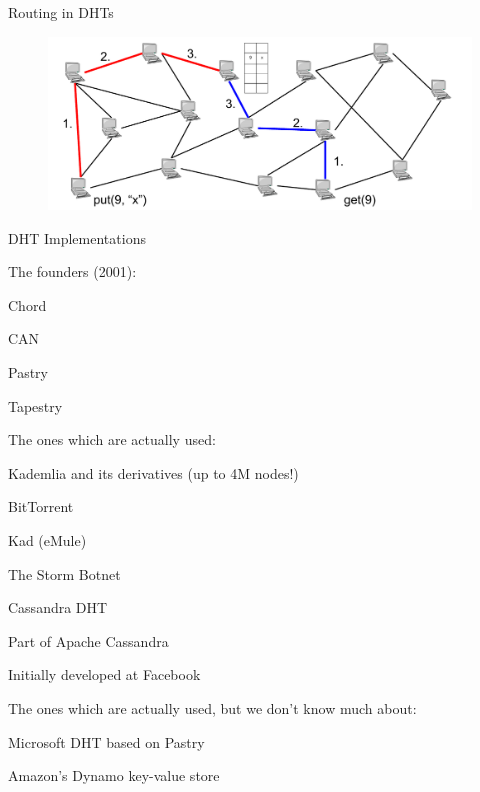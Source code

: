 \begin{frame}{Routing in DHTs}

\begin{figure}
	\includegraphics[width=\textwidth]{figs/10/dht-routing}
\end{figure}

\end{frame}

\begin{frame}{DHT Implementations}
	
\BIL
\item The founders (2001):
	\BI
	\item \alert{Chord}
	\item \alert{CAN}
	\item Pastry
	\item Tapestry
	\EI
\item The ones which are actually used:
	\BI
	\item \alert{Kademlia} and its derivatives (up to 4M nodes!)
		\BI
		\item BitTorrent
		\item Kad (eMule)
		\item The Storm Botnet
		\EI
	\item \alert{Cassandra} DHT
		\BI
		\item Part of Apache Cassandra
		\item Initially developed at Facebook
		\EI
	\EI
\item The ones which are actually used, but we don't know much about:
\BI
\item Microsoft DHT based on Pastry
\item Amazon's Dynamo key-value store
\EI
\EIL
\end{frame}

